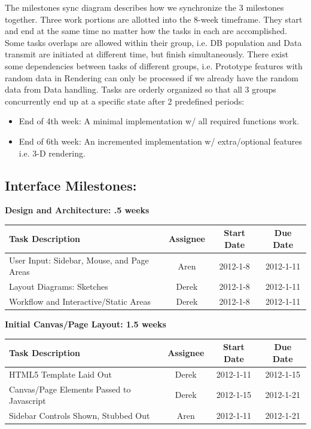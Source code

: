 \documentclass[12pt, letterpaper]{article}
\begin{document}
The milestones sync diagram describes how we synchronize the 3 milestones together. Three work portions are allotted into the 8-week timeframe. They start and end at the same time no matter how the tasks in each are accomplished. Some tasks overlaps are allowed within their group, i.e. DB population and Data transmit are initiated at different time, but finish simultaneously. There exist some dependencies between tasks of different groups, i.e. Prototype features with random data in Rendering can only be processed if we already have the random data from Data handling. Tasks are orderly organized so that all 3 groups concurrently end up at a specific state after 2 predefined periods:
  \begin{itemize}
    \item End of 4th week:  A minimal implementation w/ all required functions work.
    \item End of 6th week: An incremented implementation w/ extra/optional features i.e. 3-D rendering.
  \end{itemize}
  \subsection{Interface Milestones:}
	
  \begin{center}
		{\bf Design and Architecture: .5 weeks}
    \begin{tabular}{| p{8.3cm} || c | c | c | }
      \hline
      Task Description & Assignee & Start Date & Due Date \\
      \hline
	    User Input: Sidebar, Mouse, and Page Areas & Aren & 2012-1-8 & 2012-1-11 \\
	    Layout Diagrams: Sketches & Derek & 2012-1-8 & 2012-1-11 \\
	    Workflow and Interactive/Static Areas & Derek & 2012-1-8 & 2012-1-11 \\
      \hline
    \end{tabular}
  \end{center}

  \begin{center}
		{\bf Initial Canvas/Page Layout: 1.5 weeks}
    \begin{tabular}{| p{8.3cm} || c | c | c | }
      \hline
      Task Description & Assignee & Start Date & Due Date \\
      \hline
	    HTML5 Template Laid Out & Derek & 2012-1-11 & 2012-1-15 \\
	    Canvas/Page Elements Passed to Javascript & Derek & 2012-1-15 & 2012-1-21 \\
	    Sidebar Controls Shown, Stubbed Out & Aren & 2012-1-11 & 2012-1-21 \\
      \hline
    \end{tabular}
  \end{center}
\end{document}

